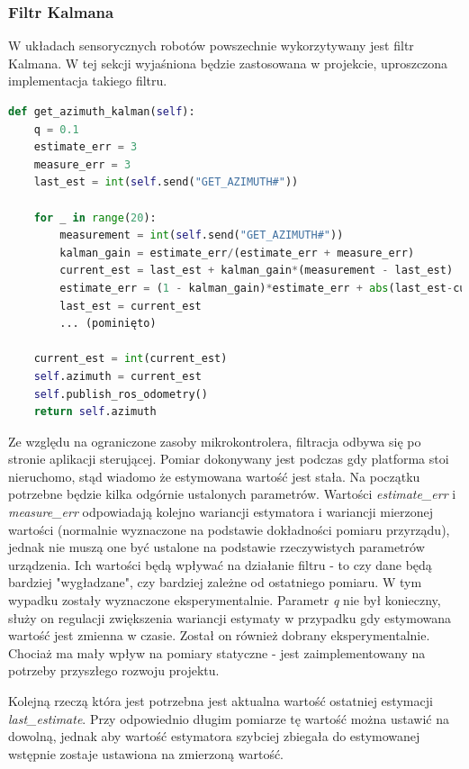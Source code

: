 \subsubsection{Filtr Kalmana}
W układach sensorycznych robotów powszechnie wykorzytywany jest filtr Kalmana\cite{Kedzierski2016}. W tej sekcji wyjaśniona będzie zastosowana w projekcie, uproszczona implementacja takiego filtru.

\begin{lstlisting}[basicstyle=\footnotesize\ttfamily,language=python,caption=Implementacja filtru Kalmana w języku Python,label=lst:kalman]
def get_azimuth_kalman(self):
    q = 0.1
    estimate_err = 3
    measure_err = 3
    last_est = int(self.send("GET_AZIMUTH#"))

    for _ in range(20):
        measurement = int(self.send("GET_AZIMUTH#"))
        kalman_gain = estimate_err/(estimate_err + measure_err)
        current_est = last_est + kalman_gain*(measurement - last_est)
        estimate_err = (1 - kalman_gain)*estimate_err + abs(last_est-current_est)*q
        last_est = current_est
        ... (pominięto)
        
    current_est = int(current_est)
    self.azimuth = current_est
    self.publish_ros_odometry()
    return self.azimuth
\end{lstlisting}

Ze względu na ograniczone zasoby mikrokontrolera, filtracja odbywa się po stronie aplikacji sterującej. Pomiar dokonywany jest podczas gdy platforma stoi nieruchomo, stąd wiadomo że estymowana wartość jest stała. Na początku potrzebne będzie kilka odgórnie ustalonych parametrów. Wartości \emph{estimate\_err} i \emph{measure\_err} odpowiadają kolejno wariancji estymatora i wariancji mierzonej wartości (normalnie wyznaczone na podstawie dokładności pomiaru przyrządu), jednak nie muszą one być ustalone na podstawie rzeczywistych parametrów urządzenia. Ich wartości będą wpływać na działanie filtru - to czy dane będą bardziej "wygładzane", czy bardziej zależne od ostatniego pomiaru. W tym wypadku zostały wyznaczone eksperymentalnie. Parametr \emph{q} nie był konieczny, służy on regulacji zwiększenia wariancji estymaty w przypadku gdy estymowana wartość jest zmienna w czasie. Został on również dobrany eksperymentalnie. Chociaż ma mały wpływ na pomiary statyczne - jest zaimplementowany na potrzeby przyszłego rozwoju projektu.

Kolejną rzeczą która jest potrzebna jest aktualna wartość ostatniej estymacji \emph{last\_estimate}. Przy odpowiednio długim pomiarze tę wartość można ustawić na dowolną, jednak aby wartość estymatora szybciej zbiegała do estymowanej wstępnie zostaje ustawiona na zmierzoną wartość.

